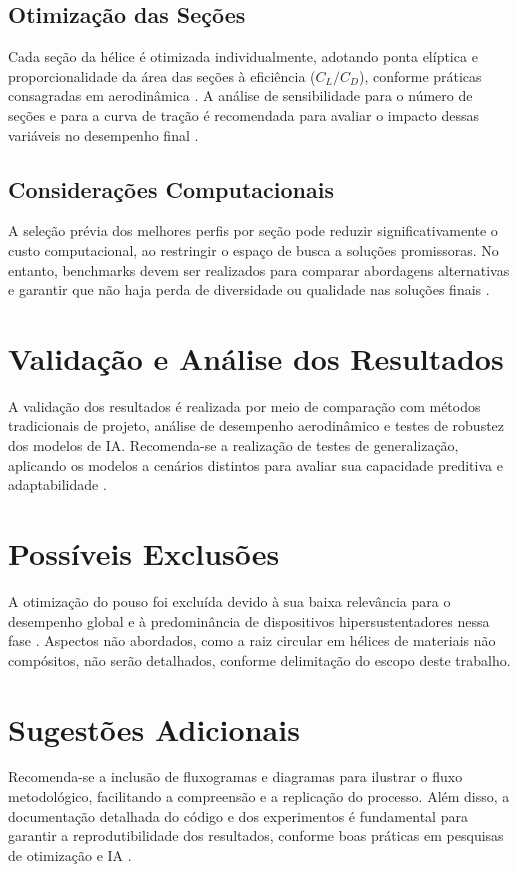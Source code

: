 \subsection{Otimização das Seções}
Cada seção da hélice é otimizada individualmente, adotando ponta elíptica e proporcionalidade da área das seções à eficiência (\(C_L/C_D\)), conforme práticas consagradas em aerodinâmica \cite{anderson2017fundamentals, abbott1959theory}. A análise de sensibilidade para o número de seções e para a curva de tração é recomendada para avaliar o impacto dessas variáveis no desempenho final \cite{wu2024}.

\subsection{Considerações Computacionais}
A seleção prévia dos melhores perfis por seção pode reduzir significativamente o custo computacional, ao restringir o espaço de busca a soluções promissoras. No entanto, benchmarks devem ser realizados para comparar abordagens alternativas e garantir que não haja perda de diversidade ou qualidade nas soluções finais \cite{oliveira2023, hasan2024}.

\section{Validação e Análise dos Resultados}
A validação dos resultados é realizada por meio de comparação com métodos tradicionais de projeto, análise de desempenho aerodinâmico e testes de robustez dos modelos de IA. Recomenda-se a realização de testes de generalização, aplicando os modelos a cenários distintos para avaliar sua capacidade preditiva e adaptabilidade \cite{hasan2024, wu2024, goodfellow2016deep}.

\section{Possíveis Exclusões}
A otimização do pouso foi excluída devido à sua baixa relevância para o desempenho global e à predominância de dispositivos hipersustentadores nessa fase \cite{raymer2018aircraft}. Aspectos não abordados, como a raiz circular em hélices de materiais não compósitos, não serão detalhados, conforme delimitação do escopo deste trabalho.

\section{Sugestões Adicionais}
Recomenda-se a inclusão de fluxogramas e diagramas para ilustrar o fluxo metodológico, facilitando a compreensão e a replicação do processo. Além disso, a documentação detalhada do código e dos experimentos é fundamental para garantir a reprodutibilidade dos resultados, conforme boas práticas em pesquisas de otimização e IA \cite{goodfellow2016deep, oliveira2023}.
